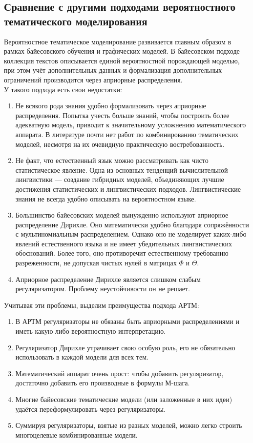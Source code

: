\documentclass[12pt]{article}
\begin{document}
\subsection{Сравнение с другими подходами вероятностного тематического моделирования}
Вероятностное тематическое моделирование развивается главным образом в рамках байесовского обучения и графических моделей. В байесовском подходе коллекция текстов описывается единой вероятностной порождающей моделью, при этом учёт дополнительных данных и формализация дополнительных ограничений производится через априорные распределения.\\
У такого подхода есть свои недостатки:
\begin{enumerate}
\item Не всякого рода знания удобно формализовать через априорные распределения. Попытка учесть больше знаний, чтобы построить более адекватную модель, приводит к значительному усложнению математического аппарата. В литературе почти нет работ по комбинированию тематических моделей, несмотря на их очевидную практическую востребованность.
\item Не факт, что естественный язык можно рассматривать как чисто статистическое явление. Одна из основных тенденций вычислительной лингвистики --- создание гибридных моделей, объединяющих лучшие достижения статистических и лингвистических подходов. Лингвистические знания не всегда удобно описывать на вероятностном языке.
\item Большинство байесовских моделей вынужденно используют априорное распределение Дирихле\cite{blei2003latent}. Оно математически удобно благодаря сопряжённости с мультиномиальным распределением. Однако оно не моделирует каких-либо явлений естественного языка и не имеет убедительных лингвистических обоснований. Более того, оно противоречит естественному требованию разреженности, не допуская чистых нулей в матрицах $\Phi$  и $\Theta$.
\item Априорное распределение Дирихле является слишком слабым регуляризатором. Проблему неустойчивости он не решает.
\end{enumerate}
Учитывая эти проблемы, выделим преимущества подхода АРТМ:
\begin{enumerate}
\item В АРТМ регуляризаторы не обязаны быть априорными распределениями и иметь какую-либо вероятностную интерпретацию.
\item Регуляризатор Дирихле утрачивает свою особую роль, его не обязательно использовать в каждой модели для всех тем.
\item Математический аппарат очень прост: чтобы добавить регуляризатор, достаточно добавить его производные в формулы М-шага.
\item Многие байесовские тематические модели (или заложенные в них идеи) удаётся переформулировать через регуляризаторы.
\item Суммируя регуляризаторы, взятые из разных моделей, можно легко строить многоцелевые комбинированные модели.
\end{enumerate}
\end{document}
